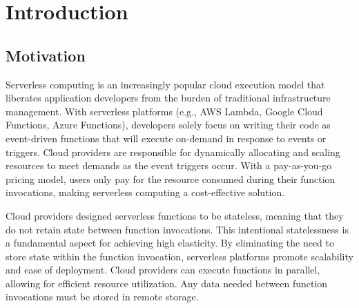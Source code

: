 

\chapter[Introduction]{Introduction}

\section{Motivation}

Serverless computing is an increasingly popular cloud execution model that liberates application developers from the burden of traditional infrastructure management. With serverless platforms (e.g., AWS Lambda, Google Cloud Functions, Azure Functions), developers solely focus on writing their code as event-driven functions that will execute on-demand in response to events or triggers. Cloud providers are responsible for dynamically allocating and scaling resources to meet demands as the event triggers occur. With a pay-as-you-go pricing model, users only pay for the resource consumed during their function invocations, making serverless computing a cost-effective solution.

Cloud providers designed serverless functions to be stateless, meaning that they do not retain state between function invocations. This intentional statelessness is a fundamental aspect for achieving high elasticity. By eliminating the need to store state within the function invocation, serverless platforms promote scalability and ease of deployment. Cloud providers can execute functions in parallel, allowing for efficient resource utilization. Any data needed between function invocations must be stored in remote storage.

